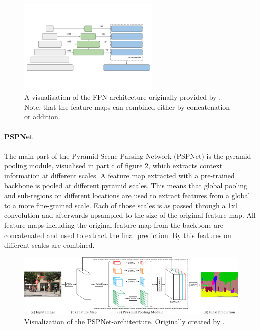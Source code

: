 \begin{figure}[htb!]
	\centering
	\includegraphics[width=0.6\textwidth]{fig/fpn-architecture.png}
	\caption{A visualisation of the FPN architecture originally provided by \citeauthor{SegmentationModels} \cite{SegmentationModels}. Note, that the feature maps can combined either by concatenation or addition.}
	\label{fig:fpn-architecture}
\end{figure}


\paragraph{PSPNet}

The main part of the Pyramid Scene Parsing Network (PSPNet) is the pyramid pooling module, visualised in part c of figure \ref{fig:pspnet-architecture}, which extracts context information at different scales. A feature map extracted with a pre-trained backbone is pooled at different pyramid scales. This means that global pooling and sub-regions on different locations are used to extract features from a global to a more fine-grained scale. Each of those scales is as passed through a 1x1 convolution and afterwards upsampled to the size of the original feature map. All feature maps including the original feature map from the backbone are concatenated and used to extract the final prediction. By this features on different scales are combined. \cite{Zhao2017, ArcGIS}

\begin{figure}[htb!]
	\centering
	\includegraphics[width=\textwidth]{fig/pspnet-architecture.png}
	\caption{Visualization of the PSPNet-architecture. Originally created by \citeauthor{Zhao2017} \cite{Zhao2017}.}
	\label{fig:pspnet-architecture}
\end{figure}

